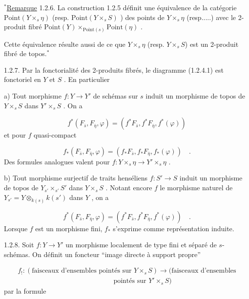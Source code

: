 $^{*}$\underline{Remarque} 1.2.6. La construction 1.2.5 définit une équivalence de la catégorie $\mathrm{Point}(Y \times_s \eta)$ (resp. $\mathrm{Point}(Y \times_s S)$ ) des points de $Y \times_s \eta$ (resp.....) avec le 2-produit fibré $\mathrm{Point}(Y) \times_{\mathrm{Point}(s)} \mathrm{Point}(\eta)$ .

Cette équivalence résulte aussi de ce que $Y \times_s \eta$ (resp. $Y \times_s S$) est un 2-produit fibré de topos.$^{*}$

1.2.7. Par la fonctorialité des 2-produits fibrés, le diagramme (1.2.4.1) est fonctoriel en $Y$ et $S$ . En particulier

a) Tout morphisme $f : Y \longrightarrow Y'$ de schémas sur $s$ induit un morphisme de topos de $Y \times_s S$ dans $Y' \times_s S$ . On a

\begin{equation}\tag{1.2.7.1}
f^{*}(F_{\bar{s}}, F_{\bar{\eta}}, \varphi ) = (f^{*} F_{\bar{s}}, f^{*} F_{\bar{\eta}} , f^{*}(\varphi))
\end{equation}
et pour $f$ quasi-compact

\begin{equation}\tag{1.2.7.2}
f_{*}(F_{\bar{s}}, F_{\bar{\eta}} , \varphi) = (f_{*} F_{\bar{s}}, f_{*} F_{\bar{\eta}} , f_{*}(\varphi)) \quad .
\end{equation}
Des formules analogues valent pour $f : Y \times_s \eta \longrightarrow Y' \times_s \eta$ .

b) Tout morphisme surjectif de traits henséliens $f : S' \longrightarrow S$ induit un morphisme de topos de $Y_{s'} \times_{s'} S'$ dans $Y \times_s S$ . Notant encore $f$ le morphisme naturel de
$Y_{s'} = Y \otimes_{k(s)} k(s')$ dans $Y$ , on a

\begin{equation}\tag{1.2.7.3}
f^{*}(F_{\bar{s}}, F_{\bar{\eta}}, \varphi) = (f^{*}F_{\bar{s}}, f^{*} F_{\bar{\eta}} , f^{*}(\varphi)) \quad .
\end{equation}
Lorsque $f$ est un morphisme fini, $f_{*}$ s'exprime comme représentation induite.

1.2.8. Soit $f : Y \longrightarrow Y'$ un morphisme localement de type fini et séparé de $s$-schémas. On définit un foncteur ``image directe à support propre''

\begin{equation*}
\begin{array}{l} f_{!} : (\mbox{faisceaux d'ensembles pointés sur } Y \times_s S) \longrightarrow (\mbox{faisceaux d'ensembles} \\ \qquad\qquad\qquad\qquad\qquad\qquad\qquad \mbox{pointés sur } Y' \times_s S) \end{array}
\end{equation*}
par la formule


